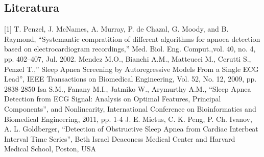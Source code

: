 \subsection{Literatura}
[1] T. Penzel, J. McNames, A. Murray, P. de Chazal, G. Moody, and B. Raymond, “Systemantic compratition of different algorithms for apnoea detection based on electrocardiogram recordings,” Med. Biol. Eng. Comput.,vol. 40, no. 4, pp. 402–407, Jul. 2002.
\newline \newline
[2] Mendez M.O., Bianchi A.M., Matteucci M., Cerutti S., Penzel T.,” Sleep Apnea Screening by Autoregressive Models From a Single ECG Lead”, IEEE Transactions on Biomedical Engineering, Vol. 52, No. 12, 2009, pp. 2838-2850 
\newline \newline
[3] Isa S.M., Fanany M.I., Jatmiko W., Arymurthy A.M., “Sleep Apnea Detection from ECG Signal: Analysis on Optimal Features, Principal Components”, and Nonlinearity, International Conference on Bioinformatics and Biomedical Engineering, 2011, pp. 1-4 
\newline \newline
[4] J. E. Mietus, C. K. Peng, P. Ch. Ivanov, A. L. Goldberger, “Detection of Obstructive Sleep Apnea from Cardiac Interbeat Interval Time Series”, Beth Israel Deaconess Medical Center and Harvard Medical School, Poston, USA

